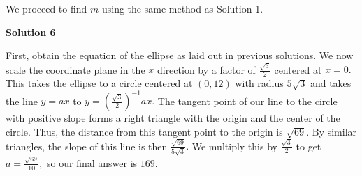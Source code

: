 \begin{enumerate}
 
We proceed to find $m$ using the same method as Solution 1.

 



\textbf{Solution 6}

First, obtain the equation of the ellipse as laid out in previous solutions. We now scale the coordinate plane in the $x$ direction by a factor of $\frac{\sqrt{3}}{2}$ centered at $x=0.$ This takes the ellipse to a circle centered at $(0,12)$ with radius $5\sqrt{3}$ and takes the line $y=ax$ to $y=\left( \frac{\sqrt{3}}{2} \right)^{-1} ax.$ The tangent point of our line to the circle with positive slope forms a right triangle with the origin and the center of the circle. Thus, the distance from this tangent point to the origin is $\sqrt{69}.$ By similar triangles, the slope of this line is then $\frac{\sqrt{69}}{5\sqrt{3}}.$ We multiply this by $\frac{\sqrt{3}}{2}$ to get $a=\frac{\sqrt{69}}{10},$ so our final answer is $\boxed{169.}$



\end{enumerate}